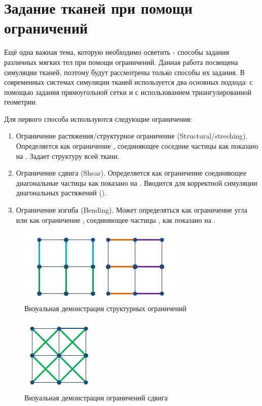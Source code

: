 \section{Задание тканей при помощи ограничений} \label{ch2:connect} %
	Ещё одна важная тема, которую необходимо осветить - способы задания различных мягких тел при помощи ограничений. Данная работа посвещена симуляции тканей, поэтому будут рассмотрены только способы их задания. В современных системах симуляции тканей используется два основных подхода: с помощью задания прямоугольной сетки и с использованием триангулированной геометрии.
	
	Для первого способа используются следующие ограничения:
	\begin{enumerate}[1.]
		\item Ограничение растяжения/структурное ограничение (Structural/streching). Определяется как ограничение , соединяющее соседние частицы как показано на . Задает структуру всей ткани.
		\item Ограничение сдвига (Shear). Определяется как ограничение  соединяющее диагональные частицы как показано на . Вводится для корректной симуляции диагональных растяжений ().
		\item Ограничение изгиба (Bending). Может определяться как ограничение угла \cite{wang2014angle} или как ограничение , соединяющее частицы , как показано на .
	\end{enumerate}
	
	\begin{figure}[ht!] 
		\center
		\includegraphics [scale=0.5] {my_folder/images//structural}
		\caption{Визуальная демонстрация структурных ограничений}
		\label{fig:structural}  
	\end{figure}
	
	\begin{figure}[ht!] 
		\center
		\includegraphics [scale=0.5] {my_folder/images//shear}
		\caption{Визуальная демонстрация ограничений сдвига}
		\label{fig:shear}  
	\end{figure}
	
